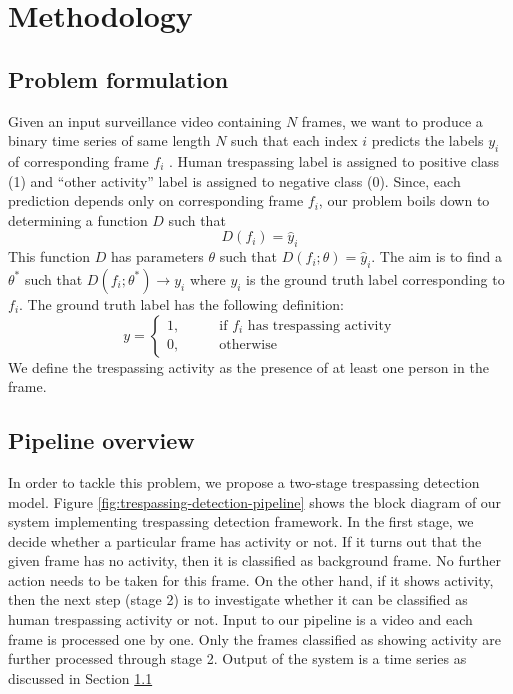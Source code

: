 \section{Methodology}
\subsection{Problem formulation}
\label{sec:prob-formulation}
Given an input surveillance video containing $N$ frames, we want to produce a binary time series of same length $N$ such that each index $i$ predicts the labels $y_i$ of corresponding frame $f_i$ . Human trespassing label is assigned to positive class (1) and ``other activity'' label is assigned to negative class (0). Since, each prediction depends only on corresponding frame $f_i$, our problem boils down to determining a function $D$ such that 
$$ D(f_i) = \hat{y}_i $$
This function $D$ has parameters $\theta$ such that $D(f_i;\theta) = \hat{y}_i$. The aim is to find a $\theta^*$ such that $D(f_i;\theta^*) \rightarrow y_i$ where $y_i$ is the ground truth label corresponding to $f_i$. The ground truth label has the following definition: 
$$y=
\begin{cases}
1,  &\qquad \textrm{if } f_i \textrm{ has trespassing activity} \\ 
0, 	&\qquad \textrm{otherwise}
\end{cases}
$$
We define the trespassing activity as the presence of at  least one person in the frame. 

\subsection{Pipeline overview}
In order to tackle this problem, we propose a two-stage trespassing detection model. 
Figure \ref{fig:trespassing-detection-pipeline} shows the block diagram of our system implementing trespassing detection framework. In the first stage, we decide whether a particular frame has activity or not. If it turns out that the given frame has no activity, then it is classified as background frame. No further action needs to be taken for this frame. On the other hand, if it shows activity, then the next step (stage 2) is to investigate whether it can be classified as human trespassing activity or not. Input to our pipeline is a video and each frame is processed one by one. Only the frames classified as showing activity are further processed through stage 2. Output of the system is a time series as discussed in Section \ref{sec:prob-formulation}


